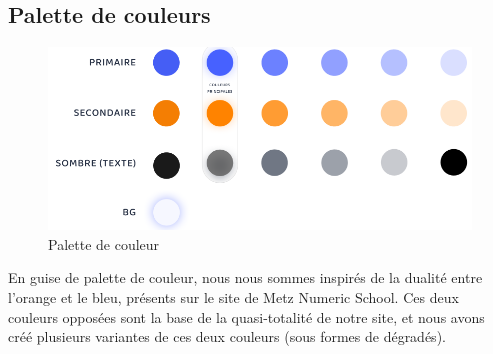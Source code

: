 \subsection{Palette de couleurs}
\label{Palette de couleurs}

\begin{figure}[th]
\centering
\includegraphics[width=\linewidth]{medias/palette.png}
\decoRule
\caption{Palette de couleur}
\end{figure}

En guise de palette de couleur, nous nous sommes inspirés de la dualité entre l'orange et le bleu, présents sur le site de Metz Numeric School. Ces deux couleurs opposées sont la base de la quasi-totalité de notre site, et nous avons créé plusieurs variantes de ces deux couleurs (sous formes de dégradés).
